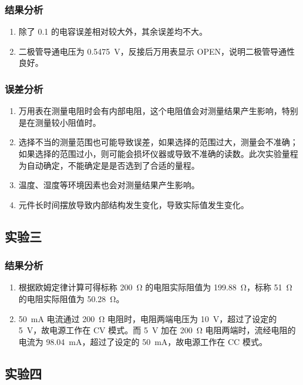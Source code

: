 \documentclass[a4paper,utf8]{article}
\begin{document}
    \subsubsection{结果分析}
    \begin{enumerate}
        \item 除了 \SI{0.1}{\uF} 的电容误差相对较大外，其余误差均不大。
        \item 二极管导通电压为 \SI{0.5475}{\V}，反接后万用表显示 OPEN，说明二极管导通性良好。
    \end{enumerate}
    \subsubsection{误差分析}
        \begin{enumerate}
            \item 万用表在测量电阻时会有内部电阻，这个电阻值会对测量结果产生影响，特别是在测量较小阻值时。
            \item 选择不当的测量范围也可能导致误差，如果选择的范围过大，测量会不准确；如果选择的范围过小，则可能会损坏仪器或导致不准确的读数。此次实验量程为自动确定，不能确定是是否选到了合适的量程。
            \item 温度、湿度等环境因素也会对测量结果产生影响。
            \item 元件长时间摆放导致内部结构发生变化，导致实际值发生变化。
        \end{enumerate}
\subsection{实验三}
\subsubsection{结果分析}
\begin{enumerate}
    \item 根据欧姆定律计算可得标称 \SI{200}{\ohm} 的电阻实际阻值为 \SI{199.88}{\ohm}，标称 \SI{51}{\ohm} 的电阻实际阻值为 \SI{50.28}{\ohm}。
    \item \SI{50}{\mA} 电流通过 \SI{200}{\ohm} 电阻时，电阻两端电压为 \SI{10}{\V}，超过了设定的 \SI{5}{\V}，故电源工作在 CV 模式。而 \SI{5}{\V} 加在 \SI{200}{\ohm} 电阻两端时，流经电阻的电流为 \SI{98.04}{\mA}，超过了设定的 \SI{50}{\mA}，故电源工作在 CC 模式。
\end{enumerate}
\subsection{实验四}
\end{document}
